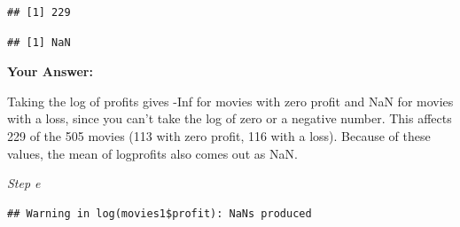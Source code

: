 \documentclass[
]{article}
\newenvironment{Shaded}{\begin{snugshade}}{\end{snugshade}}
\newcommand{\AttributeTok}[1]{\textcolor[rgb]{0.13,0.29,0.53}{#1}}
\newcommand{\ConstantTok}[1]{\textcolor[rgb]{0.56,0.35,0.01}{#1}}
\newcommand{\DecValTok}[1]{\textcolor[rgb]{0.00,0.00,0.81}{#1}}
\newcommand{\FunctionTok}[1]{\textcolor[rgb]{0.13,0.29,0.53}{\textbf{#1}}}
\newcommand{\NormalTok}[1]{#1}
\newcommand{\OtherTok}[1]{\textcolor[rgb]{0.56,0.35,0.01}{#1}}
\newcommand{\SpecialCharTok}[1]{\textcolor[rgb]{0.81,0.36,0.00}{\textbf{#1}}}
\begin{document}
\begin{verbatim}
## [1] 229
\end{verbatim}

\begin{Shaded}
\end{Shaded}

\begin{verbatim}
## [1] NaN
\end{verbatim}

\textbf{Your Answer:}

Taking the log of profits gives -Inf for movies with zero profit and NaN
for movies with a loss, since you can't take the log of zero or a
negative number. This affects 229 of the 505 movies (113 with zero
profit, 116 with a loss). Because of these values, the mean of
logprofits also comes out as NaN.

\emph{Step e}

\begin{Shaded}
\end{Shaded}

\begin{verbatim}
## Warning in log(movies1$profit): NaNs produced
\end{verbatim}

\begin{Shaded}
\end{Shaded}
\end{document}
